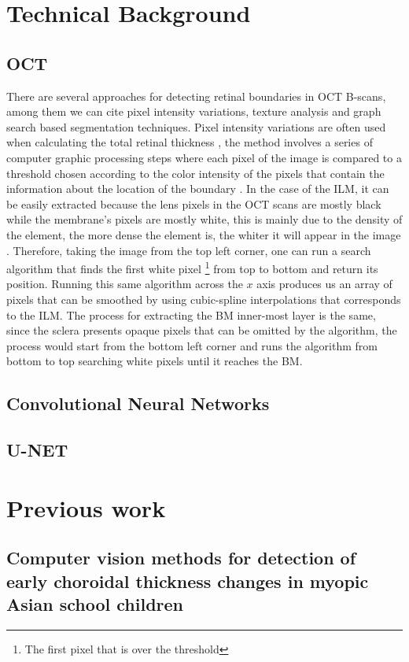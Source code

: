 \documentclass[12pt,a4paper]{scrartcl}
\begin{document}
\section{Technical Background}\label{TechBack}

\subsection{OCT}
There are several approaches for detecting retinal boundaries in OCT B-scans, among them we can cite pixel intensity variations, texture analysis and graph search based segmentation techniques. Pixel intensity variations are often used when calculating the total retinal thickness \cite{Alonso-Caneiro2013}, the method involves a series of computer graphic processing steps where each pixel of the image is compared to a threshold chosen according to the color intensity of the pixels that contain the information about the location of the boundary \cite{Fabritius:09}. In the case of the ILM, it can be easily extracted because the lens pixels in the OCT scans are mostly black while the membrane's pixels are mostly white, this is mainly due to the density of the element, the more dense the element is, the whiter it will appear in the image \cite{Brar597}. Therefore, taking the image from the top left corner, one can run a search algorithm that finds the first white pixel \footnote{The first pixel that is over the threshold} from top to bottom and return its position. Running this same algorithm across the $x$ axis produces us an array of pixels that can be smoothed by using cubic-spline interpolations that corresponds to the ILM. The process for extracting the BM inner-most layer is the same, since the sclera presents opaque pixels that can be omitted by the algorithm, the process would start from the bottom left corner and runs the algorithm from bottom to top searching white pixels until it reaches the BM.  
\subsection{Convolutional Neural Networks}
\subsection{U-NET}


\section{Previous work}\label{prevWork}
\subsection{Computer vision methods for detection of early choroidal thickness changes in myopic Asian school children}
\end{document}
